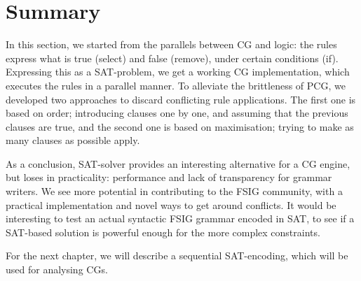 
\section{Summary}

In this section, we started from the parallels between CG and logic:
the rules express what is true ({\sc select}) and false ({\sc remove}), under certain conditions ({\sc if}).
Expressing this as a SAT-problem, we get a working CG implementation, which executes the rules in a parallel manner. 
To alleviate the brittleness of PCG, we developed two approaches to discard conflicting rule applications.
The first one is based on order; introducing clauses one by one, and assuming that the previous clauses are true, 
and the second one is based on maximisation; trying to make as many clauses as possible apply.


As a conclusion, SAT-solver provides an interesting alternative for a CG engine, but loses in practicality: performance and lack of transparency for grammar writers.
We see more potential in contributing to the FSIG community, with a practical implementation and 
novel ways to get around conflicts. It would be interesting to test an actual syntactic FSIG grammar encoded in SAT, to see if a SAT-based solution is powerful enough for the more complex constraints.

For the next chapter, we will describe a sequential SAT-encoding, which will be used for analysing CGs.






